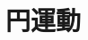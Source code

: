 \documentclass[../../all/physics-standard_questions_all.tex]{subfiles}
\begin{document}
\section{円運動}
\end{document}
